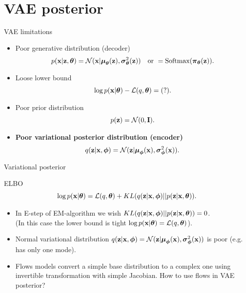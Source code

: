 \section{VAE posterior}
\begin{frame}{VAE limitations}
	\begin{itemize}
		\item Poor generative distribution (decoder)
		\[
		p(\mathbf{x} | \mathbf{z}, \boldsymbol{\theta}) = \mathcal{N}(\mathbf{x}| \boldsymbol{\mu}_{\boldsymbol{\theta}}(\mathbf{z}), \boldsymbol{\sigma}^2_{\boldsymbol{\theta}}(\mathbf{z})) \quad \text{or } = \text{Softmax}(\boldsymbol{\pi}_{\boldsymbol{\theta}}(\mathbf{z})).
		\]
		\item Loose lower bound
		\[
		\log p(\mathbf{x} | \boldsymbol{\theta}) - \mathcal{L}(q, \boldsymbol{\theta}) = (?).
		\]
		\item Poor prior distribution
		\[
		p(\mathbf{z}) = \mathcal{N}(0, \mathbf{I}).
		\]
		\item \textbf{Poor variational posterior distribution (encoder)}
		\[
		q(\mathbf{z} | \mathbf{x}, \boldsymbol{\phi}) = \mathcal{N}(\mathbf{z}| \boldsymbol{\mu}_{\boldsymbol{\phi}}(\mathbf{x}), \boldsymbol{\sigma}^2_{\boldsymbol{\phi}}(\mathbf{x})).
		\]
	\end{itemize}
\end{frame}
\begin{frame}{Variational posterior}
	\begin{block}{ELBO}
		\[
		\log p(\mathbf{x} | \boldsymbol{\theta}) = \mathcal{L}(q, \boldsymbol{\theta}) + KL(q(\mathbf{z} | \mathbf{x}, \boldsymbol{\phi}) || p(\mathbf{z} | \mathbf{x}, \boldsymbol{\theta})).
		\]
	\end{block}
	\begin{itemize}
		\item In E-step of EM-algorithm we wish $KL(q(\mathbf{z} | \mathbf{x}, \boldsymbol{\phi}) || p(\mathbf{z} | \mathbf{x}, \boldsymbol{\theta})) = 0$. \\
		(In this case the lower bound is tight $\log p(\mathbf{x} | \boldsymbol{\theta}) = \mathcal{L}(q, \boldsymbol{\theta})$). \\
		\item Normal variational distribution $q(\mathbf{z} | \mathbf{x}, \boldsymbol{\phi}) = \mathcal{N}(\mathbf{z}| \boldsymbol{\mu}_{\boldsymbol{\phi}}(\mathbf{x}), \boldsymbol{\sigma}^2_{\boldsymbol{\phi}}(\mathbf{x}))$ is poor (e.g. has only one mode). \\
		\item Flows models convert a simple base distribution to a complex one using invertible transformation with simple Jacobian. How to use flows in VAE posterior?
	\end{itemize}
\end{frame}
